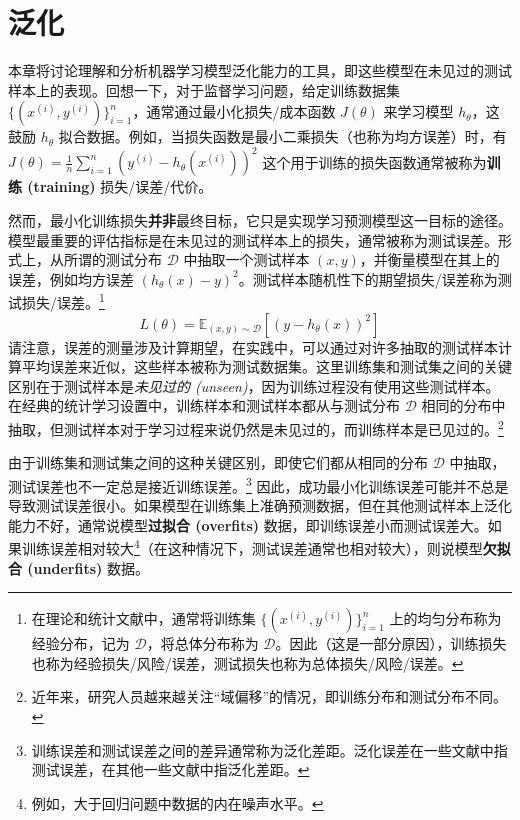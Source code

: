 \chapter{泛化}

本章将讨论理解和分析机器学习模型泛化能力的工具，即这些模型在未见过的测试样本上的表现。回想一下，对于监督学习问题，给定训练数据集 $\{(x^{(i)}, y^{(i)})\}_{i=1}^n$，通常通过最小化损失/成本函数 $J(\theta)$ 来学习模型 $h_\theta$，这鼓励 $h_\theta$ 拟合数据。例如，当损失函数是最小二乘损失（也称为均方误差）时，有 \(J(\theta) = \frac{1}{n} \sum_{i=1}^n \left(y^{(i)} - h_\theta(x^{(i)})\right)^2\) 这个用于训练的损失函数通常被称为\textbf{训练 (training)} 损失/误差/代价。

然而，最小化训练损失\textbf{并非}最终目标，它只是实现学习预测模型这一目标的途径。模型最重要的评估指标是在未见过的测试样本上的损失，通常被称为测试误差。形式上，从所谓的测试分布 $\mathcal{D}$ 中抽取一个测试样本 $(x, y)$，并衡量模型在其上的误差，例如均方误差 $(h_\theta(x) - y)^2$。测试样本随机性下的期望损失/误差称为测试损失/误差。\footnote{在理论和统计文献中，通常将训练集 $\{(x^{(i)}, y^{(i)})\}_{i=1}^n$ 上的均匀分布称为经验分布，记为 $\mathcal{D}$，将总体分布称为 $\mathcal{D}$。因此（这是一部分原因），训练损失也称为经验损失/风险/误差，测试损失也称为总体损失/风险/误差。}
\begin{equation}
    L(\theta) = \mathbb{E}_{(x,y) \sim \mathcal{D}}[(y - h_\theta(x))^2] \label{eq:8.1}
\end{equation}
请注意，误差的测量涉及计算期望，在实践中，可以通过对许多抽取的测试样本计算平均误差来近似，这些样本被称为测试数据集。这里训练集和测试集之间的关键区别在于测试样本是\textit{未见过的 (unseen)}，因为训练过程没有使用这些测试样本。在经典的统计学习设置中，训练样本和测试样本都从与测试分布 $\mathcal{D}$ 相同的分布中抽取，但测试样本对于学习过程来说仍然是未见过的，而训练样本是已见过的。\footnote{近年来，研究人员越来越关注“域偏移”的情况，即训练分布和测试分布不同。}

由于训练集和测试集之间的这种关键区别，即使它们都从相同的分布 $\mathcal{D}$ 中抽取，测试误差也不一定总是接近训练误差。\footnote{训练误差和测试误差之间的差异通常称为泛化差距。泛化误差在一些文献中指测试误差，在其他一些文献中指泛化差距。} 因此，成功最小化训练误差可能并不总是导致测试误差很小。如果模型在训练集上准确预测数据，但在其他测试样本上泛化能力不好，通常说模型\textbf{过拟合 (overfits)} 数据，即训练误差小而测试误差大。如果训练误差相对较大\footnote{例如，大于回归问题中数据的内在噪声水平。}（在这种情况下，测试误差通常也相对较大），则说模型\textbf{欠拟合 (underfits)} 数据。

